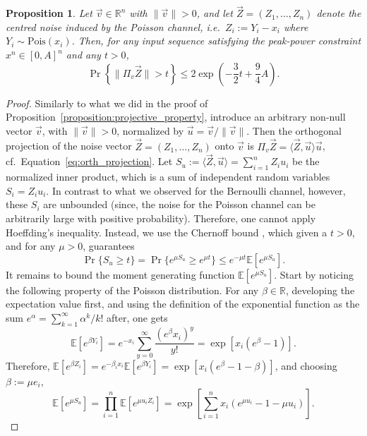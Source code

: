 \documentclass[10pt, conference]{IEEEtran}
\newtheorem{proposition}[theorem]{Proposition}
\newcommand{\1}{\mathds{1}}
\newcommand{\EE}{\mathbb{E}}
\newcommand{\RR}{\mathbb{R}}
\begin{document}
\begin{proposition}\label{proposition:poisson}
Let $\vec{v}\in\RR^n$ with $\|\vec v\|>0$, and let $\vec{Z}=(Z_1,\dots,Z_n)$ denote the centred noise induced by the Poisson channel, i.e.\ $Z_i:=Y_i-x_i$ where $Y_i\sim\mathrm{Pois}(x_i)$. Then, for any input sequence satisfying the peak-power constraint $x^n\in[0,A]^n$ and any $t>0$,
\[
\Pr\left\{\|\Pi_{v}\vec Z\|>t\right\}\leq 2\exp \left(-\frac32t+\frac{9}{4}A\right).
\]
\end{proposition}
\begin{proof}
Similarly to what we did in the proof of Proposition~\ref{proposition:projective_property}, introduce an arbitrary non-null vector $\vec v$, with $\|\vec v\|>0$, normalized by $\vec u=\vec v/\|\vec v\|$. Then the orthogonal projection of the noise vector $\vec Z=(Z_1,\dots,Z_n)$ onto $\vec v$ is $\Pi_v\vec Z=\langle \vec Z,\vec u\rangle\vec u$, cf.~Equation~\eqref{eq:orth_projection}. 
Let $S_u:=\langle\vec Z,\vec u\rangle=\sum_{i=1}^nZ_iu_i$ be the normalized inner product, which is a sum of independent random variables $S_i=Z_iu_i$. In contrast to what we observed for the Bernoulli channel, however, these $S_i$ are unbounded (since, the noise for the Poisson channel can be arbitrarily large with positive probability). Therefore, one cannot apply Hoeffding's inequality. Instead, we use the Chernoff bound \cite{Chernoff_bound}, which given a $t>0$, and for any $\mu>0$, guarantees
\begin{equation}\label{eq:chernoff}
\Pr\{S_u\geq t\}=\Pr\{e^{\mu S_u}\geq e^{\mu t}\}\leq e^{-\mu t}\EE[e^{\mu S_u}].
\end{equation}
%
It remains to bound the moment generating function $\EE[e^{\mu S_u}]$. Start by noticing the following property of the Poisson distribution. For any $\beta\in\RR$, developing the expectation value first, and using the definition of the exponential function as the sum $e^\alpha=\sum_{k=1}^\infty\alpha^k/k!$ after, one gets
\begin{equation}
\EE[e^{\beta Y_i}]=e^{-x_i}\sum_{y=0}^\infty \frac{(e^{\beta}x_i)^y}{y!}=\exp[x_i(e^\beta-1)].
\end{equation}
Therefore, $\EE[e^{\beta Z_i}]=e^{-\beta_ix_i}\EE[e^{\beta Y_i}]=\exp[x_i(e^\beta-1-\beta)]$, and choosing $\beta:=\mu e_i$,
\begin{equation}\label{eq:poisson_step}
\!\!\!\EE[e^{\mu S_u}]\!=\!\prod_{i=1}^n\EE[e^{\mu u_iZ_i}]\!=\!\exp\!\left[\sum_{i=1}^nx_i(e^{\mu u_i}-1-\mu u_i)\!\right]\!.
\end{equation}

\end{proof}
\end{document}
